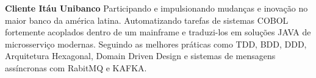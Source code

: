 \documentclass[10pt,a4paper]{altacv}
\begin{document}

\begin{fullwidth}
\makecvheader
\end{fullwidth}





	\textbf{Cliente Itáu Unibanco} Participando e impulsionando mudanças e inovação no maior banco da américa latina. Automatizando tarefas de sistemas COBOL fortemente acoplados dentro de um mainframe e traduzi-los em soluções JAVA de microsserviço modernas. Seguindo as melhores práticas como TDD, BDD, DDD, Arquitetura Hexagonal, Domain Driven Design e sistemas de mensagens assíncronas com RabitMQ e KAFKA.
	
    \divider


    \divider
\end{document}
